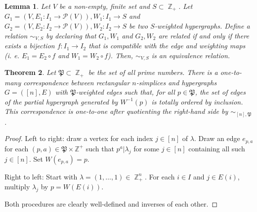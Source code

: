 \documentclass[a4paper,11pt]{amsart}
\theoremstyle{plain}
\newtheorem{theorem}{Theorem}[section]
\newtheorem{lemma}[theorem]{Lemma}
\theoremstyle{definition}
\theoremstyle{remark}
\DeclareMathOperator{\ZZ}{\mathbb{Z}}
\begin{document}
\begin{lemma}\label{lemma:equivalence-relation}
    Let $V$ be a non-empty, finite set and $S \subset \ZZ_+$. Let $G_1 = (V, E_1: I_1 \to \mathcal{P}(V)), W_1: I_1 \to S$ and $G_2 = (V, E_2: I_2 \to \mathcal{P}(V)), W_2: I_2 \to S$ be two $S$-weighted hypergraphs. Define a relation $\sim_{V, S}$ by declaring that $G_1, W_1$ and $G_2, W_2$ are related if and only if there exists a bijection $f: I_1 \to I_2$ that is compatible with the edge and weighting maps (i. e. $E_1 = E_2 \circ f$ and $W_1 = W_2 \circ f$). Then, $\sim_{V, S}$ is an equivalence relation.
\end{lemma}

\begin{theorem}\label{theorem:hypergraphs-rectangular-simplices-correspondence}
    Let $\mathfrak{P} \subset \ZZ_+$ be the set of all prime numbers. There is a one-to-many correspondence between rectangular $n$-simplices and hypergraphs $G = ([n], E)$ with $\mathfrak{P}$-weighted edges such that, for all $p \in \mathfrak{P}$, the set of edges of the partial hypergraph generated by $W^{-1}(p)$ is totally ordered by inclusion. This correspondence is one-to-one after quotienting the right-hand side by $\sim_{[n], \mathfrak{P}}$.
\end{theorem}

\begin{proof}
    Left to right: draw a vertex for each index $j \in [n]$ of $\lambda$. Draw an edge $e_{p, a}$ for each $(p, a) \in \mathfrak{P} \times \mathbb{Z^+}$ such that $p^a | \lambda_j$ for some $j \in [n]$ containing all such $j \in [n]$. Set $W(e_{p, a}) = p$.

    Right to left: Start with $\lambda = (1, \ldots, 1) \in \ZZ_+^n$. For each $i \in I$ and $j \in E(i)$, multiply $\lambda_j$ by $p = W(E(i))$.

    Both procedures are clearly well-defined and inverses of each other.
\end{proof}
\end{document}
